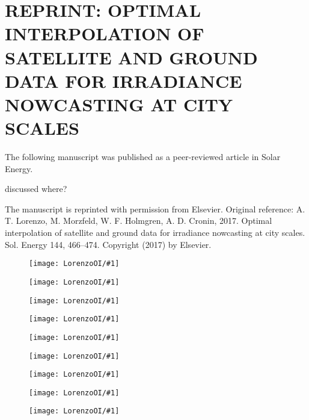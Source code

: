 \chapter{REPRINT: OPTIMAL INTERPOLATION OF SATELLITE AND GROUND DATA
  FOR IRRADIANCE NOWCASTING AT CITY SCALES}
\label{app:satoi}

The following manuscript was published as a peer-reviewed article in
Solar Energy.

discussed where?

The manuscript is reprinted with permission from Elsevier. Original
reference: A. T. Lorenzo, M. Morzfeld, W. F. Holmgren, A. D. Cronin,
2017. Optimal interpolation of satellite and ground data for
irradiance nowcasting at city scales. Sol. Energy 144, 466--474.
Copyright (2017) by Elsevier.

\newcommand{\figOI}[1]{
\begin{figure}
\texttt{[image: LorenzoOI/\#1]}
\end{figure}
}


\figOI{pg1}
\figOI{pg2}
\figOI{pg3}
\figOI{pg4}
\figOI{pg5}
\figOI{pg6}
\figOI{pg7}
\figOI{pg8}
\figOI{pg9}

